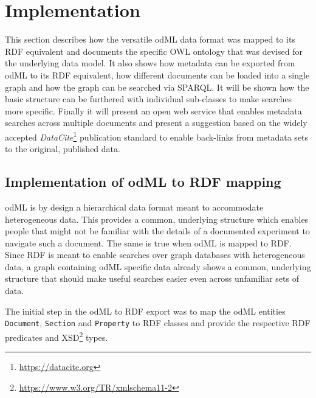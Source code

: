 \documentclass{article}
\begin{document}
\section{Implementation} \label{sec:implementation}

This section describes how the versatile odML data format was mapped to its RDF equivalent and documents the specific OWL ontology that was devised for the underlying data model. It also shows how metadata can be exported from odML to its RDF equivalent, how different documents can be loaded into a single graph and how the graph can be searched via SPARQL. It will be shown how the basic structure can be furthered with individual sub-classes to make searches more specific. Finally it will present an open web service that enables metadata searches across multiple documents and present a suggestion based on the widely accepted \textit{DataCite}\footnote{\url{https://datacite.org}} publication standard to enable back-links from metadata sets to the original, published data.

\subsection{Implementation of odML to RDF mapping} \label{sec:odml_rdf}


odML is by design a hierarchical data format meant to accommodate heterogeneous data. This provides a common, underlying structure which enables people that might not be familiar with the details of a documented experiment to navigate such a document. The same is true when odML is mapped to RDF. Since RDF is meant to enable searches over graph databases with heterogeneous data, a graph containing odML specific data already shows a common, underlying structure that should make useful searches easier even across unfamiliar sets of data.

The initial step in the odML to RDF export was to map the odML entities \texttt{Document}, \texttt{Section} and \texttt{Property} to RDF classes and provide the respective RDF predicates and XSD\footnote{\url{https://www.w3.org/TR/xmlschema11-2}} types.
\end{document}
